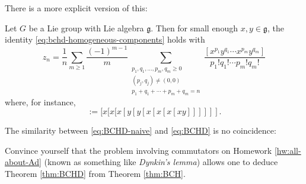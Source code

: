 \documentclass[reqno]{amsart} 
\begin{document}
There is a more explicit version of this:
\begin{theorem}\label{thm:BCHD}
  Let $G$ be a Lie group with Lie algebra $\mathfrak{g}$.  Then for small enough $x,y \in \mathfrak{g}$, the identity \eqref{eq:bchd-homogeneous-components} holds with
  \begin{equation}\label{eq:BCHD}
    z_n
    = \frac{1}{n}
    \sum_{m \geq 1}
    \frac{(-1)^{m-1}}{m}
    \sum _{\substack{
        p_1,q_1,\dotsc,p_m,q_m \geq 0  \\  
        (p_j,q_j) \neq (0,0) \\
        p_1+q_1+\dotsb+p_m+q_m=n
      }
    }
    \frac{[x^{p_1} y^{q_1} \dotsb x^{p_m} y^{q_m}]}{
      p_1! q_1! \dotsb p_m! q_m!}
  \end{equation}
  where, for instance,
  \begin{equation*}
 [x^3 y^2 x^4 y^1] := [x[x[x[y[y[x[x[x[x y]]]]]].
  \end{equation*}
\end{theorem}
The similarity between \eqref{eq:BCHD-naive} and \eqref{eq:BCHD} is no coincidence:
\begin{exercise}
  Convince yourself that the problem involving commutators on Homework \ref{hw:all-about-Ad} (known as something like \emph{Dynkin's lemma}) allows one to deduce Theorem \ref{thm:BCHD} from Theorem \ref{thm:BCH}.
\end{exercise}
\end{document}
